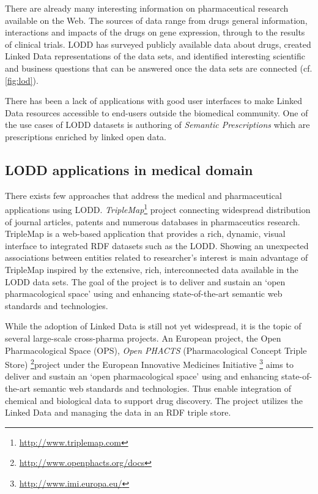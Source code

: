 \documentclass[conference]{IEEEtran}
\begin{document}
There are already many interesting information on pharmaceutical research available on the Web.
The sources of data range from drugs general information, interactions and impacts of the drugs on gene expression, through to the results of clinical trials.
LODD\cite{lodrug} has surveyed publicly available data about drugs, created Linked Data representations of the data sets, and identified interesting scientific and business questions that can be answered once the data sets are connected (cf. \autoref{fig:lod}).

There has been a lack of applications with good user interfaces to make Linked Data resources accessible to end-users outside the biomedical community.
One of the use cases of LODD datasets is authoring of \emph{Semantic Prescriptions} which are prescriptions enriched by linked open data.

\subsection{LODD applications in medical domain}
There exists few approaches that address the medical and pharmaceutical applications using LODD.
\emph{TripleMap}\footnote{\url{http://www.triplemap.com}} project connecting widespread distribution of journal articles, patents and numerous databases in pharmaceutics research.
TripleMap is a web-based application that provides a rich, dynamic, visual interface to integrated RDF datasets such as the LODD.
Showing an unexpected associations between entities related to researcher's interest is main advantage of TripleMap inspired  by the extensive, rich, interconnected data available in the LODD data sets.
The goal of the project is to deliver and sustain an ‘open pharmacological space’ using and enhancing state-of-the-art semantic web standards and technologies\cite{TripleMap}.

While the adoption of Linked Data is still not yet widespread, it is the topic of several large-scale cross-pharma projects.
 An European project, the Open Pharmacological Space (OPS), \emph{Open PHACTS }(Pharmacological Concept Triple Store) \footnote{\url{http://www.openphacts.org/docs}}project under the European Innovative Medicines Initiative \footnote{\url{http://www.imi.europa.eu/}} aims to deliver and sustain an ‘open pharmacological space’ using and enhancing state-of-the-art semantic web standards and technologies.
 Thus enable integration of chemical and biological data to support drug discovery. The project utilizes the Linked Data and managing the data in an RDF triple store\cite{Openphacts}.
\end{document}
